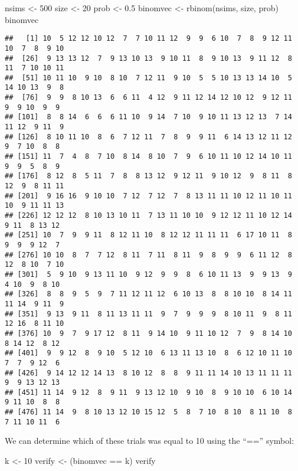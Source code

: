 \documentclass[
]{book}
\newenvironment{Shaded}{\begin{snugshade}}{\end{snugshade}}
\newcommand{\DecValTok}[1]{\textcolor[rgb]{0.00,0.00,0.81}{#1}}
\newcommand{\FloatTok}[1]{\textcolor[rgb]{0.00,0.00,0.81}{#1}}
\newcommand{\FunctionTok}[1]{\textcolor[rgb]{0.00,0.00,0.00}{#1}}
\newcommand{\NormalTok}[1]{#1}
\newcommand{\OtherTok}[1]{\textcolor[rgb]{0.56,0.35,0.01}{#1}}
\newcommand{\SpecialCharTok}[1]{\textcolor[rgb]{0.00,0.00,0.00}{#1}}
\begin{document}
\begin{Shaded}
\begin{Highlighting}[]
\NormalTok{nsims }\OtherTok{\textless{}{-}} \DecValTok{500}
\NormalTok{size }\OtherTok{\textless{}{-}} \DecValTok{20}
\NormalTok{prob }\OtherTok{\textless{}{-}} \FloatTok{0.5}
\NormalTok{binomvec }\OtherTok{\textless{}{-}} \FunctionTok{rbinom}\NormalTok{(nsims, size, prob)}
\NormalTok{binomvec}
\end{Highlighting}
\end{Shaded}

\begin{verbatim}
##   [1] 10  5 12 12 10 12  7  7 10 11 12  9  9  6 10  7  8  9 12 11 10  7  8  9 10
##  [26]  9 13 13 12  7  9 13 10 13  9 10 11  8  9 10 13  9 11 12  8 11  7 10 10 11
##  [51] 10 11 10  9 10  8 10  7 12 11  9 10  5  5 10 13 13 14 10  5 14 10 13  9  8
##  [76]  9  9  8 10 13  6  6 11  4 12  9 11 12 14 12 10 12  9 12 11  9  9 10  9  9
## [101]  8  8 14  6  6  6 11 10  9 14  7 10  9 10 11 13 12 13  7 14 11 12  9 11  9
## [126]  8 10 11 10  8  6  7 12 11  7  8  9  9 11  6 14 13 12 11 12  9  7 10  8  8
## [151] 11  7  4  8  7 10  8 14  8 10  7  9  6 10 11 10 12 14 10 11  9  9  5  8  9
## [176]  8 12  8  5 11  7  8  8 13 12  9 12 11  9 10 12  9  8 11  8 12  9  8 11 11
## [201]  9 16 16  9 10 10  7 12  7 12  7  8 13 11 11 10 12 11 10 11 10  9 11 11 13
## [226] 12 12 12  8 10 13 10 11  7 13 11 10 10  9 12 12 11 10 12 14  9 11  8 13 12
## [251] 10  7  9  9 11  8 12 11 10  8 12 12 11 11 11  6 17 10 11  8  9  9  9 12  7
## [276] 10 10  8  7  7 12  8 11  7 11  8 11  9  8  9  9  6 11 12  8 12  8 10  7 10
## [301]  5  9 10  9 13 11 10  9 12  9  9  8  6 10 11 13  9  9 13  9  4 10  9  8 10
## [326]  8  8  9  5  9  7 11 12 11 12  6 10 13  8  8 10 10  8 14 11 11 14  9 11  9
## [351]  9 13  9 11  8 11 13 11 11  9  7  9  9  9  8 10 11  9  8 11 12 16  8 11 10
## [376] 10  9  7  9 17 12  8 11  9 14 10  9 11 10 12  7  9  8 14 10  8 14 12  8 12
## [401]  9  9 12  8  9 10  5 12 10  6 13 11 13 10  8  6 12 10 11 10  7  7  9 12  6
## [426]  9 14 12 12 14 13  8 10 12  8  8  9 11 11 14 10 13 11 11 11  9  9 13 12 13
## [451] 11 14  9 12  8  9 11  9 13 12 10  9 10  8  9 10 10  6 10 14  9 11 10  8  8
## [476] 11 14  9  8 10 13 12 10 15 12  5  8  7 10  8 10  8 11 10  8  7 11 10 11  6
\end{verbatim}

We can determine which of these trials was equal to 10 using the ``=='' symbol:

\begin{Shaded}
\begin{Highlighting}[]
\NormalTok{k }\OtherTok{\textless{}{-}} \DecValTok{10}
\NormalTok{verify }\OtherTok{\textless{}{-}}\NormalTok{ (binomvec }\SpecialCharTok{==}\NormalTok{ k)}
\NormalTok{verify}
\end{Highlighting}
\end{Shaded}
\end{document}
